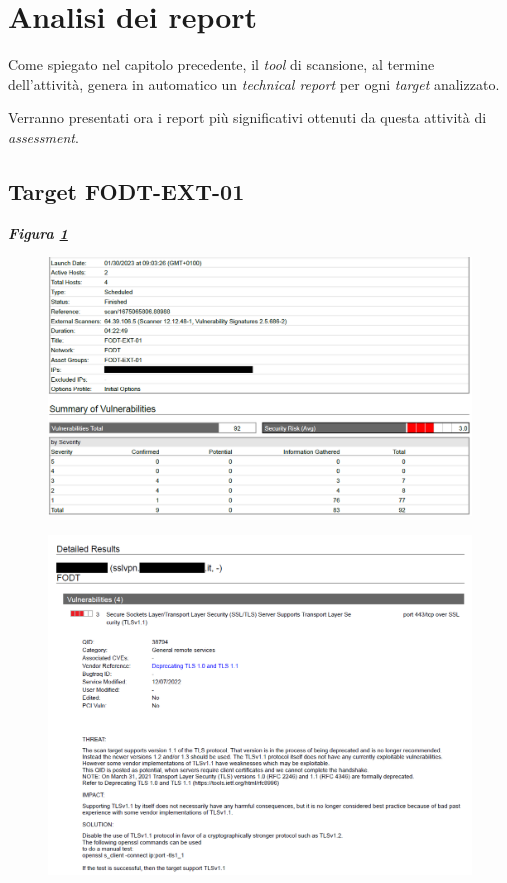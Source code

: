 \documentclass[target=bach,aauheader=]{thud}
\begin{document}
\section{Analisi dei report}
Come spiegato nel capitolo precedente, il \textit{tool} di scansione, al termine dell'attività, genera in automatico un \textit{technical report} per ogni \textit{target} analizzato.

Verranno presentati ora i report più significativi ottenuti da questa attività di \textit{assessment}.\newline

\subsection{Target FODT-EXT-01} \textbf{\textit{Figura \ref{fig:fodt-ext-01_1}}}


\begin{figure}[t]
    \centering
    \includegraphics[width=1\linewidth]{images/FODT-EXT-01_1.png}
    \caption{}
    \label{fig:fodt-ext-01_1}
\end{figure}


\begin{figure}[t]
    \centering
    \includegraphics[width=1\linewidth]{images/FODT-EXT-01_2.png}
    \caption{}
    \label{fig:fodt-ext-01_2}
\end{figure}
\end{document}
